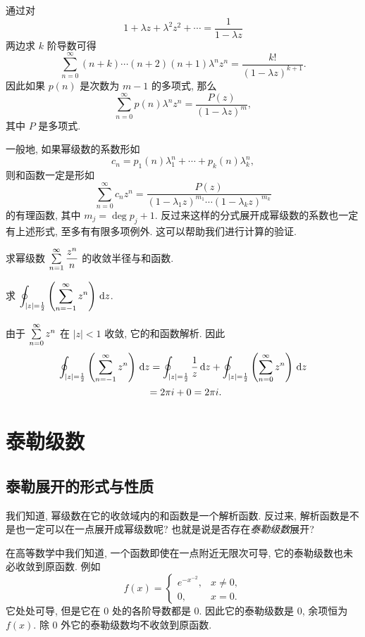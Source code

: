 通过对
\[1+\lambda z+\lambda^2 z^2+\cdots=\dfrac1{1-\lambda z}\]
两边求 $k$ 阶导数可得
\[\sum_{n=0}^{\infty}(n+k)\cdots(n+2)(n+1)\lambda^n z^n=\frac{k!}{(1-\lambda z)^{k+1}}.\]
因此如果 $p(n)$ 是次数为 $m-1$ 的多项式, 那么
\[\sum_{n=0}^\infty p(n)\lambda^n z^n=\frac{P(z)}{(1-\lambda z)^{m}},\]
其中 $P$ 是多项式.

一般地, 如果幂级数的系数形如
\[c_n=p_1(n)\lambda_1^n+\cdots+p_k(n)\lambda_k^n,\]
则和函数一定是形如
\[\sum_{n=0}^{\infty}c_nz^n
=\frac{P(z)}{(1-\lambda_1z)^{m_1}\cdots(1-\lambda_kz)^{m_k}}\]
的有理函数,	其中 $m_j=\deg p_j+1$.
反过来这样的分式展开成幂级数的系数也一定有上述形式, 至多有有限多项例外.
这可以帮助我们进行计算的验证.
\begin{exercise}
	求幂级数 $\sum\limits_{n=1}^\infty\dfrac{z^n}n$ 的收敛半径与和函数.
\end{exercise}

\begin{example}
	求 $\displaystyle\oint_{|z|=\frac{1}{2} }\left(\sum_{n=-1}^\infty z^n\right)\,\mathrm{d} z$.
\end{example}

\begin{solution}
	由于 $\sum\limits_{n=0}^\infty z^n$ 在 $|z|<1$ 收敛,
{它的和函数解析.
}{因此
	\begin{align*}
	\oint_{|z|=\frac{1}{2} }\left(\sum_{n=-1}^\infty z^n\right)\,\mathrm{d} z
	&=\oint_{|z|=\frac{1}{2} }\frac1z\,\mathrm{d} z+\oint_{|z|=\frac{1}{2} }\left(\sum_{n=0}^\infty z^n\right)\,\mathrm{d} z\\
	&{=2\pi i+0=2\pi i.}
\end{align*}}
\end{solution}

\section{泰勒级数}

\subsection{泰勒展开的形式与性质}

我们知道, 幂级数在它的收敛域内的和函数是一个解析函数.
反过来, 解析函数是不是也一定可以在一点展开成幂级数呢? 也就是说是否存在\emph{泰勒级数}展开?

在高等数学中我们知道, 一个函数即使在一点附近无限次可导, 它的泰勒级数也未必收敛到原函数.
例如
\[f(x)=\begin{cases}
e^{-x^{-2}},&x\neq 0,\\
0,&x=0.\end{cases}\]
它处处可导, 但是它在 $0$ 处的各阶导数都是 $0$.
因此它的泰勒级数是 $0$, 余项恒为 $f(x)$.
除 $0$ 外它的泰勒级数均不收敛到原函数.

